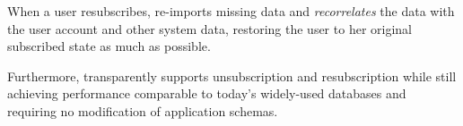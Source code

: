 %
When a user resubscribes, \sys re-imports missing data and \emph{recorrelates} the data with the
user account and other system data, restoring the user to her original subscribed state as much as
possible.

Furthermore, \sys transparently supports unsubscription and resubscription while still achieving performance
comparable to today’s widely-used databases and requiring no modification of application schemas.

%
%
%
%
